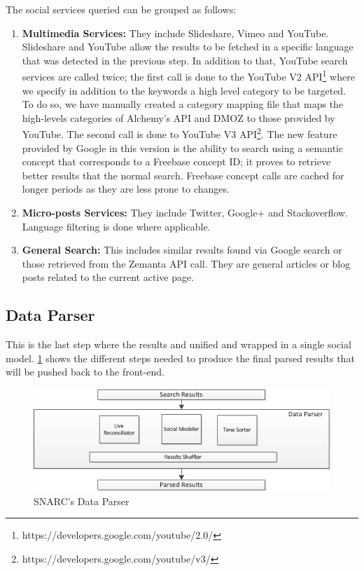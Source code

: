 \documentclass[oribibl]{llncs}
\begin{document}
The social services queried can be grouped as follows:
\begin{enumerate}
\item {\bf Multimedia Services:} They include Slideshare, Vimeo and YouTube. Slideshare and YouTube allow the results to be fetched in a specific language that was detected in the previous step. In addition to that, YouTube search services are called twice; the first call is done to the YouTube V2 API\footnote{https://developers.google.com/youtube/2.0/} where we specify in addition to the keywords a high level category to be targeted. To do so, we have manually created a category mapping file that maps the high-levels categories of Alchemy’s API and DMOZ to those provided by YouTube. The second call is done to YouTube V3 API\footnote{https://developers.google.com/youtube/v3/}. The new feature provided by Google in this version is the ability to search using a semantic concept that corresponds to a Freebase concept ID; it proves to retrieve better results that the normal search. Freebase concept calls are cached for longer periods as they are less prone to changes.
\item {\bf Micro-posts Services:} They include Twitter, Google+ and Stackoverflow. Language filtering is done where applicable.
\item {\bf General Search:} This includes similar results found via Google search or those retrieved from the Zemanta API call. They are general articles or blog posts related to the current active page.
\end{enumerate}
\subsection{Data Parser}
This is the last step where the results and unified and wrapped in a single social model. \ref{fig:3} shows the different steps needed to produce the final parsed results that will be pushed back to the front-end.
\begin{figure}[h!]
  \centering
    \includegraphics[scale=0.8]{architecture-part3.png}
  \caption{SNARC's Data Parser}
  \label{fig:3}
\end{figure}
\end{document}
